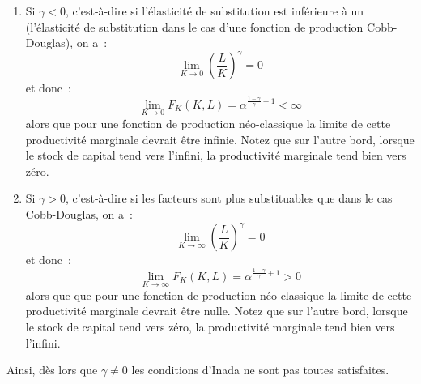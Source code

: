 \documentclass[10pt,a4paper,notitlepage]{report}
\begin{document}
\begin{enumerate}
\item Si $\gamma<0$, c'est-à-dire  si l'élasticité de substitution est
  inférieure  à un  (l'élasticité de  substitution dans  le cas  d'une
  fonction de production Cobb-Douglas), on a :
  \[
  \lim_{K\rightarrow 0} \left(\frac{L}{K}\right)^{\gamma} = 0
  \]
  et donc :
  \[
  \lim_{K\rightarrow 0} F_K(K,L) = \alpha^{\frac{1-\gamma}{\gamma}+1} < \infty
  \]
  alors que pour une fonction de production néo-classique la limite de
  cette  productivité marginale  devrait être  infinie. Notez  que sur
  l'autre bord,  lorsque le  stock de capital  tend vers  l'infini, la
  productivité marginale tend bien vers zéro.
\item  Si   $\gamma>0$,  c'est-à-dire   si  les  facteurs   sont  plus
  substituables que dans le cas Cobb-Douglas, on a :
  \[
  \lim_{K\rightarrow \infty} \left(\frac{L}{K}\right)^{\gamma} = 0
  \]
  et donc :
  \[
  \lim_{K\rightarrow \infty} F_K(K,L) = \alpha^{\frac{1-\gamma}{\gamma}+1} > 0
  \]
  alors que que pour une fonction de production néo-classique la limite de
  cette  productivité marginale  devrait être  nulle. Notez  que sur
  l'autre bord,  lorsque le  stock de capital  tend vers  zéro, la
  productivité marginale tend bien vers l'infini.
\end{enumerate}
Ainsi, dès lors que $\gamma\neq 0$  les conditions d'Inada ne sont pas
toutes satisfaites.


\bigskip
\bigskip
\end{document}
